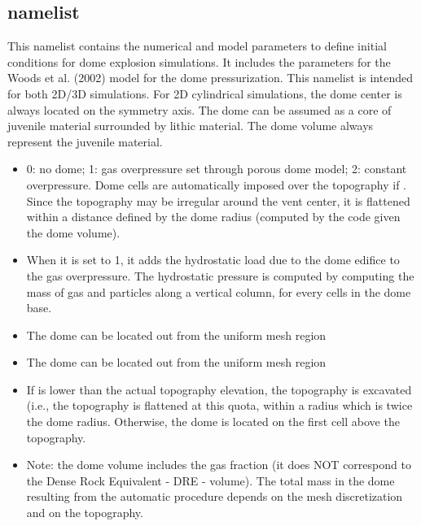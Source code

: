 \subsection{ namelist}
This namelist contains the numerical and model parameters to define initial
conditions for dome explosion simulations. It includes the parameters for
the Woods et al. (2002) model for the dome pressurization.
This namelist is intended for both 2D/3D simulations. For 2D cylindrical
simulations, the dome center is always located on the symmetry axis.
The dome can be assumed as a core of juvenile material surrounded by lithic material. The dome volume always represent the juvenile material.

\begin{itemize}
\item
{}
{0: no dome; 1: gas overpressure set through porous dome model; 2: constant overpressure.
Dome cells are automatically imposed over the topography if .
Since the topography may be irregular around the vent
center, it is flattened within a distance defined by the
dome radius (computed by the code given the dome volume).}

\item
{}
{When it is set to 1, it adds the hydrostatic load due to the dome edifice 
to the gas overpressure. The hydrostatic pressure is computed by computing
the mass of gas and particles along a vertical column, for every cells
in the dome base.}

\item
{}
{The dome can be located out from the uniform mesh region}

\item
{}
{The dome can be located out from the uniform mesh region}

\item
{}
{If  is lower than the actual topography elevation, the 
topography is excavated (i.e., the topography is flattened at this quota,
within a radius which is twice the dome radius. 
Otherwise, the dome is located on the first cell above the topography.}

\item
{}
{Note: the dome volume includes the gas fraction (it does NOT correspond to the
Dense Rock Equivalent - DRE - volume). The total mass in the dome resulting 
from the automatic procedure depends on the mesh discretization and on 
the topography.}


\end{itemize}
